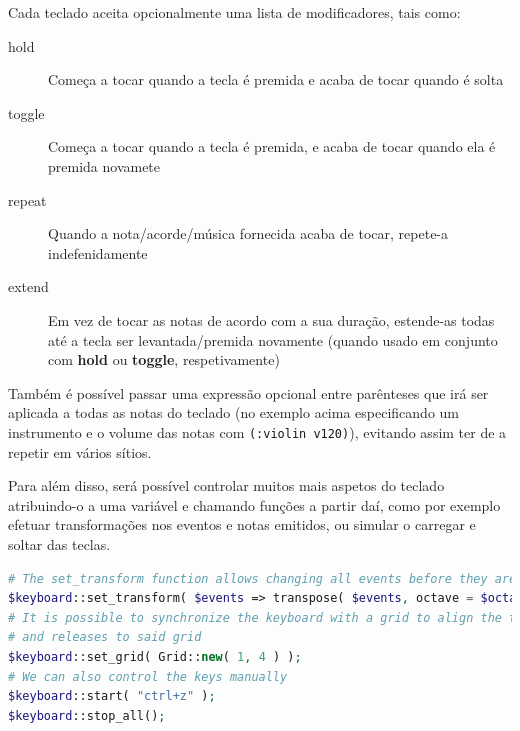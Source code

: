 Cada\label{modifiers} teclado aceita opcionalmente uma lista de modificadores, tais como:
\begin{description}
    \item[hold] Começa a tocar quando a tecla é premida e acaba de tocar quando é solta
    \item[toggle] Começa a tocar quando a tecla é premida, e acaba de tocar quando ela é premida novamete
    \item[repeat] Quando a nota/acorde/música fornecida acaba de tocar, repete-a indefenidamente
    \item[extend] Em vez de tocar as notas de acordo com a sua duração, estende-as todas até a tecla ser levantada/premida novamente (quando usado em conjunto com \textbf{hold} ou \textbf{toggle}, respetivamente)
\end{description}

Também é possível passar uma expressão opcional entre parênteses que irá ser aplicada a todas as notas do teclado (no exemplo acima especificando um instrumento e o volume das notas com \texttt{(:violin v120)}), evitando assim ter de a repetir em vários sítios.

Para além disso, será possível controlar muitos mais aspetos do teclado atribuindo-o a uma variável e chamando funções a partir daí, como por exemplo efetuar transformações nos eventos e notas emitidos, ou simular o carregar e soltar das teclas.

\begin{lstlisting}[caption=Exemplo da sintaxe proposta da linguagem,language=PHP]
# The set_transform function allows changing all events before they are emitted by this keyboard
$keyboard::set_transform( $events => transpose( $events, octave = $octave ) );
# It is possible to synchronize the keyboard with a grid to align the timings of key presses 
# and releases to said grid
$keyboard::set_grid( Grid::new( 1, 4 ) );
# We can also control the keys manually
$keyboard::start( "ctrl+z" );
$keyboard::stop_all();

\end{lstlisting}

